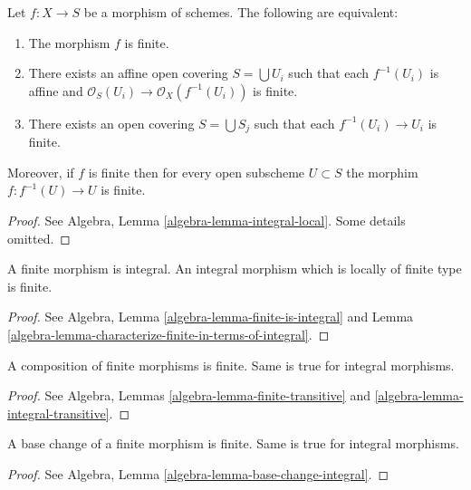 \begin{lemma}
\label{lemma-finite-local}
Let $f : X \to S$ be a morphism of schemes.
The following are equivalent:
\begin{enumerate}
\item The morphism $f$ is finite.
\item There exists an affine open covering $S = \bigcup U_i$ such that
each $f^{-1}(U_i)$ is affine and
$\mathcal{O}_S(U_i) \to \mathcal{O}_X(f^{-1}(U_i))$ is finite.
\item There exists an open covering $S = \bigcup S_j$
such that each $f^{-1}(U_i) \to U_i$ is finite.
\end{enumerate}
Moreover, if $f$ is finite then for every open subscheme
$U \subset S$ the morphim $f : f^{-1}(U) \to U$ is finite.
\end{lemma}

\begin{proof}
See Algebra, Lemma \ref{algebra-lemma-integral-local}.
Some details omitted.
\end{proof}

\begin{lemma}
\label{lemma-finite-integral}
A finite morphism is integral.
An integral morphism which is locally of finite type is finite.
\end{lemma}

\begin{proof}
See Algebra, Lemma \ref{algebra-lemma-finite-is-integral}
and Lemma \ref{algebra-lemma-characterize-finite-in-terms-of-integral}.
\end{proof}

\begin{lemma}
\label{lemma-composition-finite}
A composition of finite morphisms is finite.
Same is true for integral morphisms.
\end{lemma}

\begin{proof}
See Algebra, Lemmas \ref{algebra-lemma-finite-transitive}
and \ref{algebra-lemma-integral-transitive}.
\end{proof}

\begin{lemma}
\label{lemma-base-change-finite}
A base change of a finite morphism is finite.
Same is true for integral morphisms.
\end{lemma}

\begin{proof}
See Algebra, Lemma \ref{algebra-lemma-base-change-integral}.
\end{proof}

